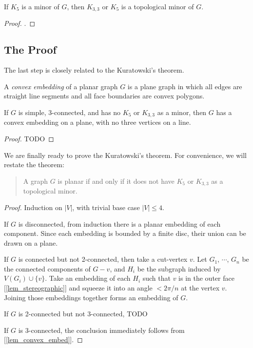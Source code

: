         \begin{lemma} \label{lem_minor_K5}
            If $K_5$ is a minor of $G$, then $K_{3,3}$ or $K_5$ is a topological minor of $G$.
        \end{lemma}
        
        \begin{proof}
            .
        \end{proof}
    
    \subsection{The Proof}
    
        The last step is closely related to the Kuratowski's theorem.
    
        \begin{defn} \label{def_convex_embed}
            A \emph{convex embedding} of a planar graph $G$ is a plane graph in which all edges are straight line segments and all face boundaries are convex polygons.
        \end{defn}
        
        \begin{lemma} \label{lem_convex_embed}
            If $G$ is simple, 3-connected, and has no $K_5$ or $K_{3,3}$ as a minor, then $G$ has a convex embedding on a plane, with no three vertices on a line.
        \end{lemma}
        
        \begin{proof}
            TODO
        \end{proof}
        
        We are finally ready to prove the Kuratowski's theorem. For convenience, we will restate the theorem:
        
        \begin{quote}
            A graph $G$ is planar if and only if it does not have $K_5$ or $K_{3,3}$ as a topological minor.
        \end{quote}
        
        \begin{proof}
            Induction on $|V|$, with trivial base case $|V| \leq 4$.
            
            If $G$ is disconnected, from induction there is a planar embedding of each component. Since each embedding is bounded by a finite disc, their union can be drawn on a plane.
            
            If $G$ is connected but not 2-connected, then take a cut-vertex $v$. Let $G_1$, $\cdots$, $G_n$ be the connected components of $G-v$, and $H_i$ be the subgraph induced by $V(G_i) \cup \{v\}$. Take an embedding of each $H_i$ such that $v$ is in the outer face [\ref{lem_stereographic}] and squeeze it into an angle $< 2\pi / n$ at the vertex $v$. Joining those embeddings together forms an embedding of $G$.
            
            If $G$ is 2-connected but not 3-connected, TODO
            
            If $G$ is 3-connected, the conclusion immediately follows from [\ref{lem_convex_embed}].
        \end{proof}
    
